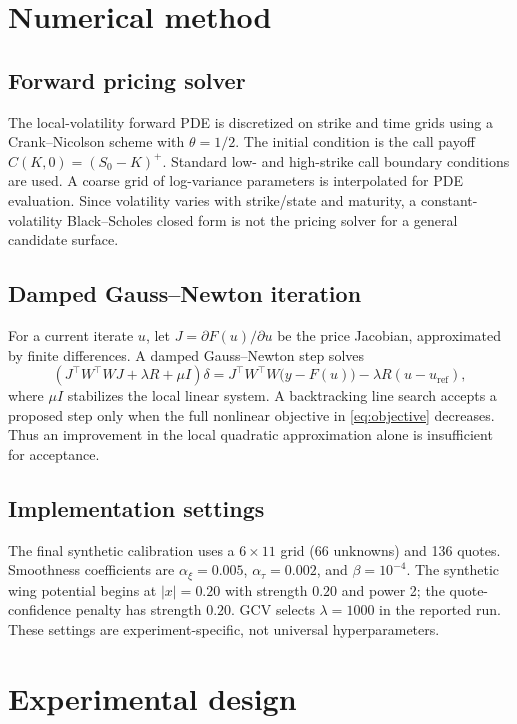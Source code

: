 \documentclass[11pt,a4paper]{article}
\begin{document}
\section{Numerical method}\label{sec:numerics}
\subsection{Forward pricing solver}
The local-volatility forward PDE is discretized on strike and time grids using a Crank--Nicolson scheme with $\theta=1/2$. The initial condition is the call payoff $C(K,0)=(S_0-K)^+$. Standard low- and high-strike call boundary conditions are used. A coarse grid of log-variance parameters is interpolated for PDE evaluation. Since volatility varies with strike/state and maturity, a constant-volatility Black--Scholes closed form is not the pricing solver for a general candidate surface.

\subsection{Damped Gauss--Newton iteration}
For a current iterate $u$, let $J=\partial F(u)/\partial u$ be the price Jacobian, approximated by finite differences. A damped Gauss--Newton step solves
\begin{equation}\label{eq:GN}
 \left(J^\top W^\top WJ+\lambda R+\mu I\right)\delta
 =J^\top W^\top W\bigl(y-F(u)\bigr)-\lambda R(u-u_{\mathrm{ref}}),
\end{equation}
where $\mu I$ stabilizes the local linear system. A backtracking line search accepts a proposed step only when the full nonlinear objective in \eqref{eq:objective} decreases. Thus an improvement in the local quadratic approximation alone is insufficient for acceptance.

\subsection{Implementation settings}
The final synthetic calibration uses a $6\times11$ grid (66 unknowns) and 136 quotes. Smoothness coefficients are $\alpha_\xi=0.005$, $\alpha_\tau=0.002$, and $\beta=10^{-4}$. The synthetic wing potential begins at $|x|=0.20$ with strength $0.20$ and power 2; the quote-confidence penalty has strength $0.20$. GCV selects $\lambda=1000$ in the reported run. These settings are experiment-specific, not universal hyperparameters.

\section{Experimental design}\label{sec:design}
\end{document}
